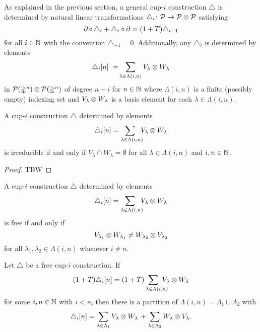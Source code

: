 %

As explained in the previous section, a general cup-$i$ construction $\triangle$ is determined by natural linear transformations $\triangle_i \colon \mathcal{P} \to \mathcal{P} \otimes \mathcal{P}$ satisfying
\[
\operatorname{\partial} \circ \, \triangle_i + \triangle_i \circ \operatorname{\partial} =
(1+T) \triangle_{i-1}
\]
for all $i \in \mathbb{N}$ with the convention $\triangle_{-1} = 0$.
Additionally, any $\triangle_i$ is determined by elements
\[
\triangle_i [n] \ = \! \sum_{\lambda \in \Lambda(i,n)} V_\lambda \ot W_\lambda
\]
in $\mathcal{P}(\mathbb{\Delta}^n) \otimes \mathcal{P}(\mathbb{\Delta}^n)$ of degree $n+i$ for $n \in \mathbb{N}$ where $\Lambda(i,n)$ is a finite (possibly empty) indexing set and $V_\lambda \otimes W_\lambda$ is a basis element for each $\lambda \in \Lambda(i,n)$.

\begin{lemma} \label{l:irreducubility recasted}
	A cup-$i$ construction $\triangle$ determined by elements
	\[
	\triangle_i [n] = \sum_{\lambda \in \Lambda(i,n) \kern-5pt} V_\lambda \otimes W_\lambda
	\]
	is irreducible if and only if $V_\lambda \cap W_\lambda = \emptyset$ for all $\lambda \in \Lambda(i,n)$ and $i, n \in \mathbb{N}$.
\end{lemma}

\begin{proof}
	TBW
\end{proof}

\begin{lemma} \label{l:freeness recasted}
	A cup-$i$ construction $\triangle$ determined by elements
	\[
	\triangle_i [n] = \sum_{\lambda \in \Lambda(i,n) \kern-5pt} V_\lambda \otimes W_\lambda
	\]
	is free if and only if
	\[
	V_{\lambda_1} \otimes W_{\lambda_1} \neq
	W_{\lambda_2} \otimes V_{\lambda_2}
	\]
	for all $\lambda_1, \lambda_2 \in \Lambda(i,n)$ whenever $i \neq n$.
\end{lemma}


\begin{lemma} \label{l:splitting of summands}
	Let $\triangle$ be a free cup-$i$ construction.
	If
	\[
	(1+T) \triangle_i [n] =
	(1+T) \sum_{\lambda \in \Lambda(i,n) \kern-10pt} {V_\lambda} \ot {W_\lambda}
	\]
	for some $i,n \in \mathbb{N}$ with $i < n$, then there is a partition of $\Lambda(i,n) = \Lambda_1 \sqcup \Lambda_2$ with
	\begin{equation} \label{e:splitting after 1+T}
	\triangle_i [n] =
	\sum_{\lambda \in \Lambda_1} {V_\lambda} \otimes {W_\lambda} \, +
	\sum_{\lambda \in \Lambda_2} {W_\lambda} \otimes {V_\lambda}.
	\end{equation}
\end{lemma}

